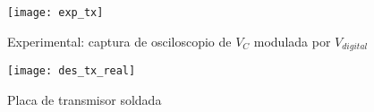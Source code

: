 \begin{figure}[h!]
    \centering
    \texttt{[image: exp\_tx]}
    \caption{Experimental: captura de osciloscopio de $V_C$ modulada por $V_{digital}$}
    \label{fig:exp_vc_vdig}
\end{figure}

\begin{figure}[h!]
    \centering
    \texttt{[image: des\_tx\_real]}
    \caption{Placa de transmisor soldada}
    \label{fig:exp_placa_tx}
\end{figure}

% 
% 

